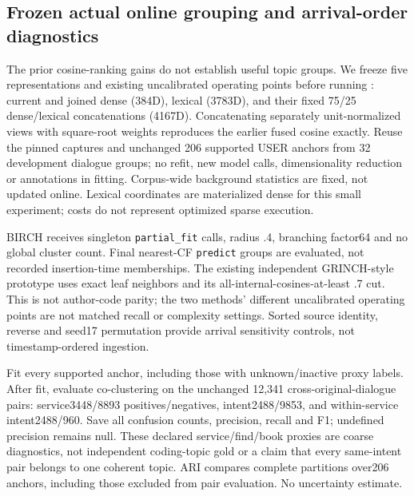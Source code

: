 \documentclass[11pt]{article}
\begin{document}
\subsection{Frozen actual online grouping and arrival-order diagnostics}
The prior cosine-ranking gains do not establish useful topic groups. We freeze
five representations and existing uncalibrated operating points before running
: current and joined dense (384D),
lexical (3783D), and their fixed 75/25 dense/lexical concatenations (4167D).
Concatenating separately unit-normalized views with square-root weights reproduces
the earlier fused cosine exactly. Reuse the pinned captures and unchanged 206
supported USER anchors from 32 development dialogue groups; no refit, new model
calls, dimensionality reduction or annotations in fitting. Corpus-wide background
statistics are fixed, not updated online. Lexical coordinates are materialized
dense for this small experiment; costs do not represent optimized sparse execution.

BIRCH\cite{birch} receives singleton \texttt{partial\_fit} calls, radius .4,
branching factor64 and no global cluster count. Final nearest-CF \texttt{predict}
groups are evaluated, not recorded insertion-time memberships. The existing
independent GRINCH-style prototype\cite{grinch} uses exact leaf neighbors and
its all-internal-cosines-at-least .7 cut. This is not author-code parity; the two
methods' different uncalibrated operating points are not matched recall or
complexity settings. Sorted source identity, reverse and seed17 permutation
provide arrival sensitivity controls, not timestamp-ordered ingestion.

Fit every supported anchor, including those with unknown/inactive proxy labels.
After fit, evaluate co-clustering on the unchanged 12,341 cross-original-dialogue
pairs: service3448/8893 positives/negatives, intent2488/9853, and within-service
intent2488/960. Save all confusion counts, precision, recall and F1; undefined
precision remains null. These declared service/find/book proxies are coarse
diagnostics, not independent coding-topic gold or a claim that every same-intent
pair belongs to one coherent topic. ARI compares complete partitions over206
anchors, including those excluded from pair evaluation. No uncertainty estimate.
\end{document}
